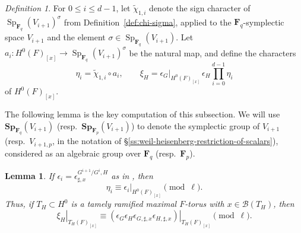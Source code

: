 \documentclass[reqno]{amsart}
\numberwithin{equation}{subsection}
\newcommand{\F}{\mathbf{F}}
\newcommand{\wt}[1]{\widetilde{#1}}
\newcommand{\co}{\colon}
\newcommand\cB{\mathcal{B}}
\DeclareMathOperator{\Sp}{Sp}
\newtheorem{lemma}[thm]{Lemma}
\theoremstyle{remark}
\newtheorem{defn}[thm]{Definition}
\numberwithin{equation}{subsection}
\numberwithin{figure}{subsection}
\begin{document}
\begin{defn}\label{defn:levi-descent-twisting}
For $0 \leq i \leq d-1$, let $\wt\chi_{1,i}$ denote the sign character of $\Sp_{\F_q}(V_{i+1})^\sigma$ from Definition~\ref{def:chi-sigma}, applied to the $\F_q$-symplectic space $V_{i+1}$ and the element $\sigma \in \Sp_{\F_q}(V_{i+1})$. Let $a_i\co H^0(F)_{[x]} \to \Sp_{\F_q}(V_{i+1})^\sigma$ be the natural map, and define the characters
\[
\eta_i = \wt\chi_{1,i}\circ a_i, \qquad \xi_H = \epsilon_G|_{H^0(F)_{[x]}}\,\epsilon_H\prod_{i=0}^{d-1}\eta_i
\]
of $H^0(F)_{[x]}$.
\end{defn}

The following lemma is the key computation of this subsection. We will use $\mathbf{Sp}_{\F_q}(V_{i+1})$ (resp.\ $\mathbf{Sp}_{\F_p}(V_{i+1})$) to denote the symplectic group of $V_{i+1}$ (resp.\ $V_{i+1, p}$, in the notation of \S\ref{ss:weil-heisenberg-restriction-of-scalars}), considered as an algebraic group over $\F_q$ (resp.\ $\F_p$).

\begin{lemma}\label{lemma:eta-sign-comparison}
If $\epsilon_i = \epsilon_{\sharp,x}^{G^{i+1}/G^i,H}$ as in \cite[Lemma~3.2.2]{CF26a}, then
\begin{equation}\label{eq:eta-sign-comparison}
\eta_i \equiv \epsilon_i|_{H^0(F)_{[x]}} \pmod{\ell}.
\end{equation}
Thus, if $T_H \subset H^0$ is a tamely ramified maximal $F$-torus with $x \in \cB(T_H)$, then
\[
\left.\xi_H\right|_{T_H(F)_{[x]}} \equiv \left.(\epsilon_G\epsilon_H\epsilon_{G,\sharp,x}\epsilon_{H,\sharp,x})\right|_{T_H(F)_{[x]}} \pmod{\ell}.
\]
\end{lemma}
\end{document}
